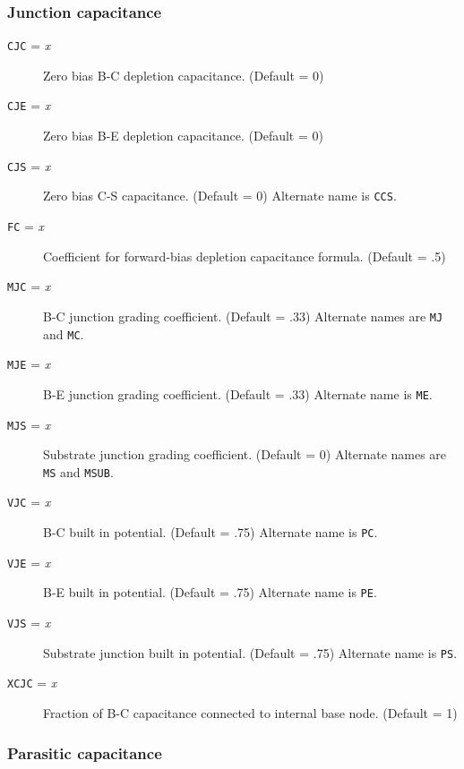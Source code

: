 \subsubsection{Junction capacitance}

\begin{description}

\item[{\tt CJC} = {\it x}]
Zero bias B-C depletion capacitance.  (Default = 0)

\item[{\tt CJE} = {\it x}]
Zero bias B-E depletion capacitance.  (Default = 0)

\item[{\tt CJS} = {\it x}]
Zero bias C-S capacitance.  (Default = 0)  Alternate name is {\tt CCS}.

\item[{\tt FC} = {\it x}]
Coefficient for forward-bias depletion capacitance formula.  (Default
= .5)

\item[{\tt MJC} = {\it x}]
B-C junction grading coefficient.  (Default = .33) Alternate names are
{\tt MJ} and {\tt MC}.

\item[{\tt MJE} = {\it x}]
B-E junction grading coefficient.  (Default = .33) Alternate name is
{\tt ME}.

\item[{\tt MJS} = {\it x}]
Substrate junction grading coefficient.  (Default = 0) Alternate names
are {\tt MS} and {\tt MSUB}.

\item[{\tt VJC} = {\it x}]
B-C built in potential.  (Default = .75)  Alternate name is {\tt PC}.

\item[{\tt VJE} = {\it x}]
B-E built in potential.  (Default = .75) Alternate name is {\tt PE}.

\item[{\tt VJS} = {\it x}]
Substrate junction built in potential.  (Default = .75)  Alternate name
is {\tt PS}.

\item[{\tt XCJC} = {\it x}]
Fraction of B-C capacitance connected to internal base node.  (Default = 1)

\end{description}

\subsubsection{Parasitic capacitance}

